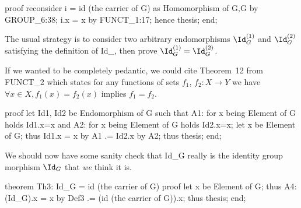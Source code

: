 \nwenddocs{}\endmoddef\nwstartdeflinemarkup{}\nwenddeflinemarkup
proof
  reconsider i = id (the carrier of G) as Homomorphism of G,G by GROUP_6:38;
  i.x = x by FUNCT_1:17;
  hence thesis;
end;

\nwendcode{}\nwdocspar

The usual strategy is to consider two arbitrary endomorphisms
$\Id^{(1)}_{G}$ and $\Id^{(2)}_{G}$ satisfying the definition of
{\Tt{}Id{\_}\nwendquote}, then prove $\Id^{(1)}_{G} = \Id^{(2)}_{G}$.

If we wanted to be completely pedantic, we could cite Theorem~12 from
{\Tt{}FUNCT{\_}2\nwendquote} which states for any functions of sets
$f_{1}$, $f_{2}\colon X\to Y$ we have $\forall x\in X, f_{1}(x)=f_{2}(x)$
implies $f_{1}=f_{2}$.

\nwenddocs{}\endmoddef\nwstartdeflinemarkup{}\nwenddeflinemarkup
proof
  let Id1, Id2 be Endomorphism of G such that
  A1: for x being Element of G holds Id1.x=x and
  A2: for x being Element of G holds Id2.x=x;
  let x be Element of G;
  thus Id1.x = x by A1
            .= Id2.x by A2;
  thus thesis;
end;

\nwendcode{}\nwdocspar

\M\label{thm:characteristic:identity-endomorphism-is-identity-function}
We should now have some sanity check that {\Tt{}Id{\_}G\nwendquote} really is
the identity group morphism $\Id_{G}$ that \emph{we} think it is.

\nwenddocs{}\endmoddef\nwstartdeflinemarkup{}\nwenddeflinemarkup
theorem Th3:
  Id_G = id (the carrier of G)
proof
  let x be Element of G;
  thus A4: (Id_G).x = x by Def3
                   .= (id (the carrier of G)).x;
  thus thesis;
end;

